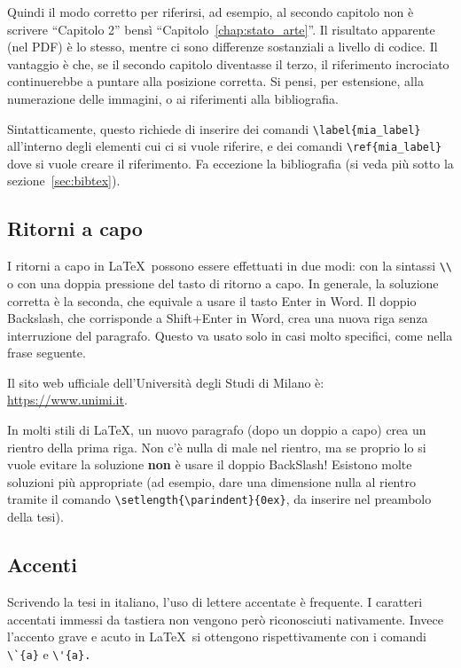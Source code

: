 Quindi il modo corretto per riferirsi, ad esempio, al secondo capitolo non è scrivere ``Capitolo 2'' bensì ``Capitolo~\ref{chap:stato_arte}''. Il risultato apparente (nel PDF) è lo stesso, mentre ci sono differenze sostanziali a livello di codice. Il vantaggio è che, se il secondo capitolo diventasse il terzo, il riferimento incrociato continuerebbe a puntare alla posizione corretta. Si pensi, per estensione, alla numerazione delle immagini, o ai riferimenti alla bibliografia.

Sintatticamente, questo richiede di inserire dei comandi \verb|\label{mia_label}| all'interno degli elementi cui ci si vuole riferire, e dei comandi \verb|\ref{mia_label}| dove si vuole creare il riferimento. Fa eccezione la bibliografia (si veda pi\`u sotto la sezione~\ref{sec:bibtex}).


\subsection{Ritorni a capo}

I ritorni a capo in \LaTeX\ possono essere effettuati in due modi: con la sintassi \verb|\\| o con una doppia pressione del tasto di ritorno a capo. In generale, la soluzione corretta è la seconda, che equivale a usare il tasto Enter in Word. Il doppio Backslash, che corrisponde a Shift+Enter in Word, crea una nuova riga senza interruzione del paragrafo. Questo va usato solo in casi molto specifici, come nella frase seguente.

Il sito web ufficiale dell'Università degli Studi di Milano è:\\
\url{https://www.unimi.it}.

In molti stili di \LaTeX, un nuovo paragrafo (dopo un doppio a capo) crea un rientro della prima riga. Non c'\`e nulla di male nel rientro, ma se proprio lo si vuole evitare la soluzione \textbf{non} \`e usare il doppio BackSlash! Esistono molte soluzioni pi\`u appropriate (ad esempio, dare una dimensione nulla al rientro tramite il comando \verb|\setlength{\parindent}{0ex}|, da inserire nel preambolo della tesi).

\subsection{Accenti}

Scrivendo la tesi in italiano, l'uso di lettere accentate \`e frequente. I caratteri accentati immessi da tastiera non vengono per\`o riconosciuti nativamente. Invece l'accento grave e acuto in \LaTeX\ si ottengono rispettivamente con i comandi \verb|\`{a}| e \verb|\'{a}.| 

